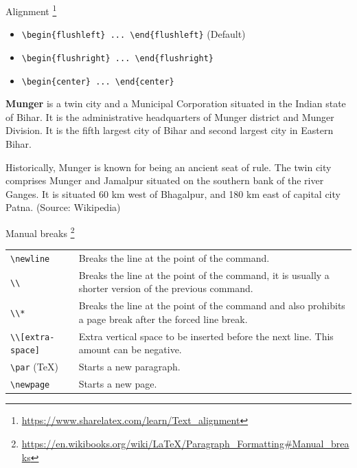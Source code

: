 \documentclass[10pt]{beamer}
\begin{document}
\begin{frame}[fragile]{Alignment
\footnote{\url{https://www.sharelatex.com/learn/Text_alignment}}}
\begin{itemize}
	\item \verb|\begin{flushleft} ... \end{flushleft}| (Default)
	\item \verb|\begin{flushright} ... \end{flushright}|
	\item \verb|\begin{center} ... \end{center}|
\end{itemize}

\begin{flushright}
\textbf{Munger} is a twin city and a Municipal Corporation situated in the Indian state of Bihar. It is the administrative headquarters of Munger district and Munger Division. It is the fifth largest city of Bihar and second largest city in Eastern Bihar.

Historically, Munger is known for being an ancient seat of rule. The twin city comprises Munger and Jamalpur situated on the southern bank of the river Ganges. It is situated 60 km west of Bhagalpur, and 180 km east of capital city Patna.
(Source: Wikipedia) \hfill
\end{flushright}
\end{frame}

\begin{frame}[fragile]{Manual breaks
\footnote{\url{https://en.wikibooks.org/wiki/LaTeX/Paragraph_Formatting\#Manual_breaks}}}
\begin{tabular}{l p{8cm}}
	\verb|\newline| 	    & Breaks the line at the point of the command.\\[1em]
	\verb|\\|	            & Breaks the line at the point of the command, it is usually a shorter version of the previous command.\\[1em]
	\verb|\\*|              & Breaks the line at the point of the command and also prohibits a page break after the forced line break. \\[1em]
	\verb|\\[extra-space]|  & Extra vertical space to be inserted before the next line. This amount can be negative.\\[1em]
	\verb|\par| (TeX)       & Starts a new paragraph. \\[1em]
	\verb|\newpage|         & Starts a new page.
\end{tabular}	
\end{frame}
\end{document}
